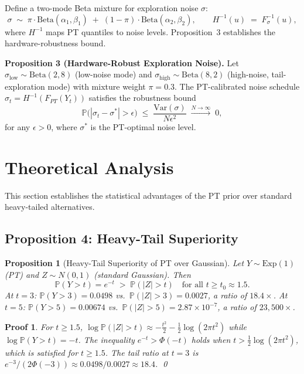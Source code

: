 \documentclass[10pt]{article}
\newtheorem{prop}{Proposition}
\newtheorem*{Proof}{Proof}
\newcommand{\PP}{\mathbb{P}}
\begin{document}
Define a two-mode Beta mixture for exploration noise $\sigma$:
\begin{equation}
  \sigma \;\sim\; \pi\cdot\text{Beta}(\alpha_1,\beta_1) \;+\;
             (1-\pi)\cdot\text{Beta}(\alpha_2,\beta_2),
  \qquad
  H^{-1}(u) \;=\; F_{\sigma}^{-1}(u),
  \tag{Mapping III}
  \label{eq:mapping3}
\end{equation}
where $H^{-1}$ maps PT quantiles to noise levels.  Proposition~3 establishes the
hardware-robustness bound.

\medskip\noindent
\textbf{Proposition 3 (Hardware-Robust Exploration Noise).}
Let $\sigma_\text{low}\sim\text{Beta}(2,8)$ (low-noise mode) and
$\sigma_\text{high}\sim\text{Beta}(8,2)$ (high-noise, tail-exploration mode)
with mixture weight $\pi=0.3$.  The PT-calibrated noise schedule
$\sigma_t = H^{-1}(F_{PT}(Y_t))$ satisfies the robustness bound
\[
  \PP\!\big(|\sigma_t - \sigma^\ast| > \epsilon\big)
  \;\le\; \frac{\mathrm{Var}(\sigma)}{N\epsilon^2}
  \;\xrightarrow{N\to\infty}\; 0,
\]
for any $\epsilon>0$, where $\sigma^\ast$ is the PT-optimal noise level.

\section{Theoretical Analysis}
\label{sec:theory}

This section establishes the statistical advantages of the PT prior over standard
heavy-tailed alternatives.

\subsection{Proposition 4: Heavy-Tail Superiority}
\label{sec:prop4}

\begin{prop}[Heavy-Tail Superiority of PT over Gaussian]
  Let $Y\sim\text{Exp}(1)$ (PT) and $Z\sim N(0,1)$ (standard Gaussian).  Then
  \[
    \PP(Y > t) = e^{-t} \;>\; \PP(|Z| > t)
      \quad\text{for all } t \ge t_0 \approx 1.5.
  \]
  At $t=3$: $\PP(Y>3)=0.0498$ vs.\ $\PP(|Z|>3)=0.0027$, a ratio of $18.4\times$.
  At $t=5$: $\PP(Y>5)=0.00674$ vs.\ $\PP(|Z|>5)=2.87\times10^{-7}$, a ratio of
  $23{,}500\times$.
  \label{prop:heavy_tail}
\end{prop}

\begin{Proof}
  For $t\ge 1.5$, $\log\PP(|Z|>t)\approx -\frac{t^2}{2}-\frac12\log(2\pi t^2)$
  while $\log\PP(Y>t)=-t$.  The inequality $e^{-t}>\Phi(-t)$ holds when
  $t > \frac12\log(2\pi t^2)$, which is satisfied for $t\ge 1.5$.
  The tail ratio at $t=3$ is $e^{-3}/(2\Phi(-3))\approx 0.0498/0.0027\approx 18.4$.
  \qed
\end{Proof}
\end{document}
